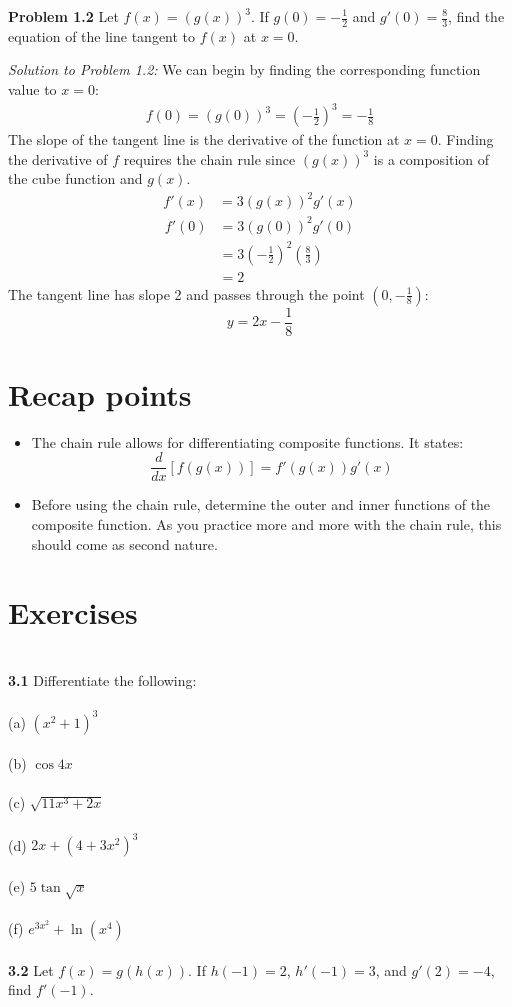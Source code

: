 \documentclass[11pt]{scrartcl}
\begin{document}
\begin{tcolorbox}
[colback=purple!5!white,colframe=purple!75!black]
\textbf{Problem 1.2} Let $f(x)=(g(x))^3$. If $g(0)=-\frac{1}{2}$ and $g'(0)=\frac{8}{3}$, find the equation of the line tangent to $f(x)$ at $x=0$.
\end{tcolorbox}
\noindent
\textit{Solution to Problem 1.2:} We can begin by finding the corresponding function value to $x=0$:
\begin{align*}
    f(0)=(g(0))^3=\left(-\frac{1}{2}\right)^3=-\frac{1}{8}
\end{align*}
The slope of the tangent line is the derivative of the function at $x=0$. Finding the derivative of $f$ requires the chain rule since $(g(x))^3$ is a composition of the cube function and $g(x)$.
\begin{align*}
    f'(x) & = 3(g(x))^2g'(x)
\end{align*}
\begin{align*}
    f'(0) & = 3(g(0))^2g'(0)\\
          & = 3\left(-\frac{1}{2}\right)^2\left(\frac{8}{3}\right)\\
          & = 2
\end{align*}
The tangent line has slope 2 and passes through the point $(0,-\frac{1}{8})$:
$$y=2x-\frac{1}{8}$$
\section{Recap points}
\begin{itemize}
    \item The chain rule allows for differentiating composite functions. It states: 
    $$\frac{d}{dx}[f(g(x))]=f'(g(x))g'(x)$$
    \item Before using the chain rule, determine the outer and inner functions of the composite function. As you practice more and more with the chain rule, this should come as second nature. 
\end{itemize}
\section{Exercises}\\
\noindent
\textbf{3.1} Differentiate the following:\\
\noindent\\
(a) $(x^2+1)^3$\\
\noindent\\
(b) $\cos 4x$\\
\noindent\\
(c) $\sqrt {11x^3+2x}$\\
\noindent\\
(d) $2x+(4+3x^2)^3$\\
\noindent\\
(e) $5\tan \sqrt x$\\
\\
\noindent
(f) $e^{3x^2}+\ln(x^4)$ \\
\\
\noindent 
\textbf{3.2} Let $f(x)=g(h(x))$. If $h(-1)=2$, $h'(-1)=3$, and $g'(2)=-4$, find $f'(-1)$.\\ 
\end{document}
